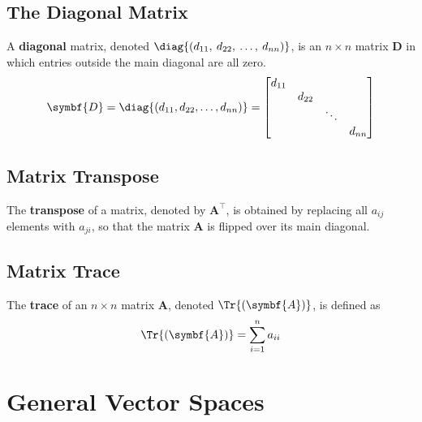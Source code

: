 \documentclass{article}
\begin{document}
\subsection{The Diagonal Matrix}
\begin{definition}
    A \textbf{diagonal} matrix, denoted
    \(\diag{\left( d_{11},\: d_{22},\: \ldots,\: d_{nn} \right)}\), is
    an \(n \times n\) matrix \(\symbf{D}\) in which entries outside
    the main diagonal are all zero.
    \begin{equation*}
        \symbf{D} = \diag{\left( d_{11}, d_{22}, \ldots, d_{nn} \right)} =
        \begin{bmatrix}
            d_{11} &        &        &        \\
                   & d_{22} &        &        \\
                   &        & \ddots &        \\
                   &        &        & d_{nn}
        \end{bmatrix}
    \end{equation*}
\end{definition}
\subsection{Matrix Transpose}
\begin{definition}
    The \textbf{transpose} of a matrix, denoted by \(\symbf{A}^\top\),
    is obtained by replacing all \(a_{ij}\) elements with \(a_{ji}\), so
    that the matrix \(\symbf{A}\) is flipped over its main diagonal.
\end{definition}
\subsection{Matrix Trace}
\begin{definition}
    The \textbf{trace} of an \(n \times n\) matrix \(\symbf{A}\),
    denoted \(\Tr{\left( \symbf{A} \right)}\), is defined as
    \begin{equation*}
        \Tr{\left( \symbf{A} \right)} = \sum_{i=1}^n a_{ii}
    \end{equation*}
\end{definition}
\section{General Vector Spaces}
\end{document}
